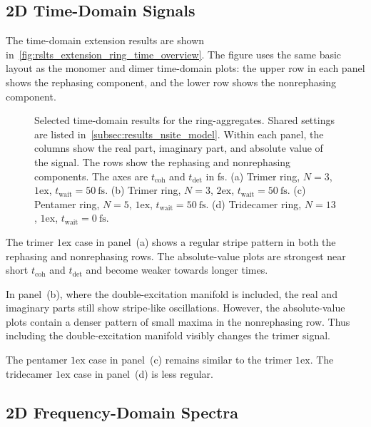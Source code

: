 \subsection{2D Time-Domain Signals}
\label{subsec:results_nsite_time_domain}

The time-domain extension results are shown in~\autoref{fig:rslts_extension_ring_time_overview}. The figure uses the same basic layout as the monomer and dimer time-domain plots: the upper row in each panel shows the rephasing component, and the lower row shows the nonrephasing component.

\begin{figure}[htbp]
  \centering
  \caption{Selected time-domain results for the ring-aggregates. Shared settings are listed in~\autoref{subsec:results_nsite_model}. Within each panel, the columns show the real part, imaginary part, and absolute value of the signal. The rows show the rephasing and nonrephasing components. The axes are \(t_{\mathrm{coh}}\) and \(t_{\mathrm{det}}\) in \si{\femto\second}. (a) Trimer ring, \(N=3\), \(1\mathrm{ex}\), \(t_{\mathrm{wait}}=\SI{50}{\femto\second}\). (b) Trimer ring, \(N=3\), \(2\mathrm{ex}\), \(t_{\mathrm{wait}}=\SI{50}{\femto\second}\). (c) Pentamer ring, \(N=5\), \(1\mathrm{ex}\), \(t_{\mathrm{wait}}=\SI{50}{\femto\second}\). (d) Tridecamer ring, \(N=13\), \(1\mathrm{ex}\), \(t_{\mathrm{wait}}=\SI{0}{\femto\second}\).}
  \label{fig:rslts_extension_ring_time_overview}
\end{figure}

The trimer \(1\mathrm{ex}\) case in panel~(a) shows a regular stripe pattern in both the rephasing and nonrephasing rows. The absolute-value plots are strongest near short \(t_{\mathrm{coh}}\) and \(t_{\mathrm{det}}\) and become weaker towards longer times.

In panel~(b), where the double-excitation manifold is included, the real and imaginary parts still show stripe-like oscillations. However, the absolute-value plots contain a denser pattern of small maxima in the nonrephasing row. Thus including the double-excitation manifold visibly changes the trimer signal.

The pentamer \(1\mathrm{ex}\) case in panel~(c) remains similar to the trimer \(1\mathrm{ex}\). The tridecamer \(1\mathrm{ex}\) case in panel~(d) is less regular.

\subsection{2D Frequency-Domain Spectra}
\label{subsec:results_nsite_frequency_domain}

